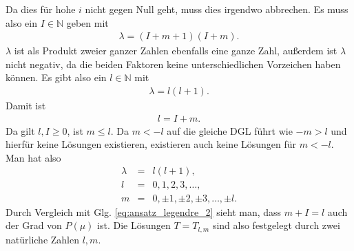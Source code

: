 \documentclass{book}
\begin{document}
%
Da dies für hohe $i$ nicht gegen Null geht, muss dies irgendwo abbrechen. Es muss also ein $I\in\mathbb{N}$ geben mit
%
\begin{eqnarray}
\lambda = \left(I + m + 1\right)\left(I + m\right).
\end{eqnarray}
%
$\lambda$ ist als Produkt zweier ganzer Zahlen ebenfalls eine ganze Zahl, außerdem ist $\lambda$ nicht negativ, da die beiden Faktoren keine unterschiedlichen Vorzeichen haben können. Es gibt also ein $l\in\mathbb{N}$ mit
%
\begin{eqnarray}
\lambda = l\left(l + 1\right).
\end{eqnarray}
%
Damit ist
%
\begin{eqnarray}
l = I + m.
\end{eqnarray}
%
Da gilt $l, I\geq 0$, ist $m\leq l$. Da $m< - l$ auf die gleiche DGL führt wie $-m > l$ und hierfür keine Lösungen existieren, existieren auch keine Lösungen für $m< - l$. Man hat also
%
\begin{eqnarray}
\lambda & = & l\left(l + 1\right),\\
l & = & 0, 1, 2, 3, \dotsc,\\
m & = & 0, \pm 1, \pm 2, \pm 3, \dotsc, \pm l.
\end{eqnarray}
%
Durch Vergleich mit Glg. \eqref{eq:ansatz_legendre_2} sieht man, dass $m + I = l$ auch der Grad von $P\left(\mu\right)$ ist. Die Lösungen $T = T_{l, m}$ sind also festgelegt durch zwei natürliche Zahlen $l, m$. 
\end{document}
